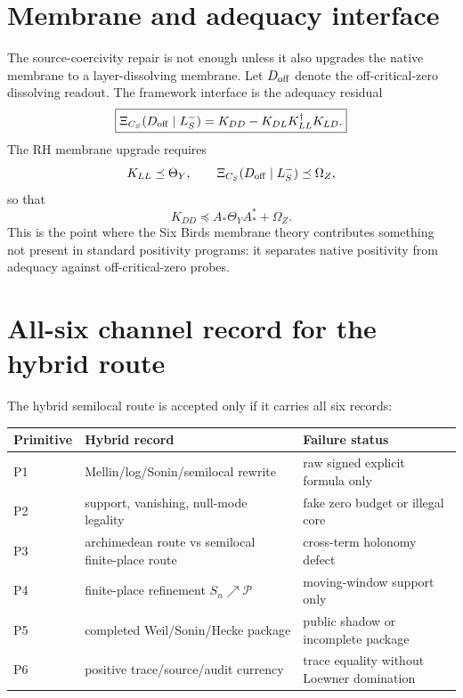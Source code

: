 \documentclass[11pt]{article}
\begin{document}
\section{Membrane and adequacy interface}
The source-coercivity repair is not enough unless it also upgrades the native membrane to a layer-dissolving membrane.  Let \(D_{\rm off}\) denote the off-critical-zero dissolving readout.  The framework interface is the adequacy residual
\[
\boxed{
\Xi_{C_S}(D_{\rm off}\mid L_S^-)
=K_{DD}-K_{DL}K_{LL}^{\dagger}K_{LD}.
}
\]
The RH membrane upgrade requires
\[
K_{LL}\preceq \Theta_Y,
\qquad
\Xi_{C_S}(D_{\rm off}\mid L_S^-)\preceq \Omega_Z,
\]
so that
\[
K_{DD}\preceq A_*\Theta_YA_*^*+\Omega_Z.
\]
This is the point where the Six Birds membrane theory contributes something not present in standard positivity programs: it separates native positivity from adequacy against off-critical-zero probes.

\section{All-six channel record for the hybrid route}
The hybrid semilocal route is accepted only if it carries all six records:
\begin{center}
\begin{tabular}{lll}
\toprule
Primitive & Hybrid record & Failure status\\
\midrule
P1 & Mellin/log/Sonin/semilocal rewrite & raw signed explicit formula only\\
P2 & support, vanishing, null-mode legality & fake zero budget or illegal core\\
P3 & archimedean route vs semilocal finite-place route & cross-term holonomy defect\\
P4 & finite-place refinement \(S_n\nearrow\mathcal P\) & moving-window support only\\
P5 & completed Weil/Sonin/Hecke package & public shadow or incomplete package\\
P6 & positive trace/source/audit currency & trace equality without Loewner domination\\
\bottomrule
\end{tabular}
\end{center}
\end{document}
